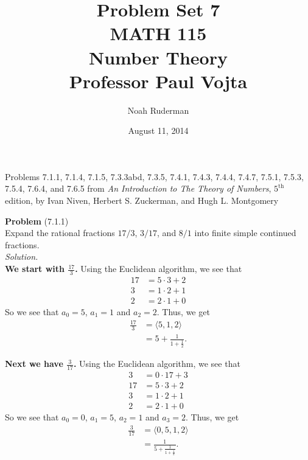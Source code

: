 \documentclass[12 pt]{amsart}
\begin{document}
\allowdisplaybreaks
\title
[Problem Set 7]
{Problem Set 7 \\
MATH 115 \\
Number Theory \\
Professor Paul Vojta}

\author{Noah Ruderman}

\date{ August 11, 2014}

\maketitle
\begin{center}
	Problems 7.1.1, 7.1.4, 7.1.5, 7.3.3abd, 7.3.5, 7.4.1, 7.4.3, 7.4.4, 7.4.7, 7.5.1, 7.5.3, 7.5.4, 7.6.4, and 7.6.5 
	from \emph{An Introduction to The Theory of Numbers}, 
	$5^{\text{th}}$ edition,
	by Ivan Niven, Herbert S. Zuckerman, and Hugh L. Montgomery 
\end{center}


\newpage
\phantom{\quad} \vfill
\noindent
\textbf{Problem} (7.1.1) \\[4ex]
  Expand the rational fractions
  $17/3$,
  $3/17$,
  and
  $8/1$
  into finite simple continued fractions.
  \\[2ex]
\emph{Solution.} \\[2ex]
  \indent
  \textbf{We start with $\frac{17}{3}$.}
  Using the Euclidean algorithm, we see that 
  \begin{align*}
    17 &= 5 \cdot 3 + 2 \\
    3 &= 1 \cdot 2 + 1 \\
    2 &= 2 \cdot 1 + 0
  \end{align*}
  So we see that $a_0 = 5$, $a_1 = 1$ and $a_2 = 2$.
  Thus, we get
  \begin{align*}
    \frac{17}{3} 
    &= 
     \langle 5, 1, 2 \rangle \\
    &=
     5 + \frac{1}{1 + \frac{1}{2}}.
  \end{align*}

  \textbf{Next we have $\frac{3}{17}$.}
  Using the Euclidean algorithm, we see that 
  \begin{align*}
    3 &= 0 \cdot 17 + 3 \\
    17 &= 5 \cdot 3 + 2 \\
    3 &= 1 \cdot 2 + 1 \\
    2 &= 2 \cdot 1 + 0
  \end{align*}
  So we see that $a_0 = 0$, $a_1 = 5$, $a_2 = 1$ and $a_3 = 2$.
  Thus, we get
  \begin{align*}
    \frac{3}{17} 
    &=
     \langle 0, 5, 1, 2 \rangle \\
    &= 
     \frac{1}{5 + \frac{1}{1 + \frac{1}{2}}}.
  \end{align*}
\end{document}
